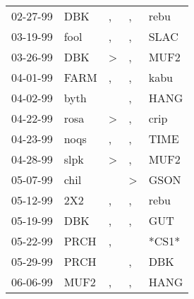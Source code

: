 \begin{supertabular}{p{0.07\textwidth}p{0.06\textwidth}p{0.02\textwidth}p{0.02\textwidth}p{0.06\textwidth}}
          02-27-99\textsuperscript{} &            DBK\textsuperscript{} &                , &                , &           rebu\textsuperscript{} \\
          03-19-99\textsuperscript{} &           fool\textsuperscript{} &                , &                , &           SLAC\textsuperscript{} \\
          03-26-99\textsuperscript{} &            DBK\textsuperscript{} &     \textgreater &                , &           MUF2\textsuperscript{} \\
          04-01-99\textsuperscript{} &           FARM\textsuperscript{} &                , &                , &           kabu\textsuperscript{} \\
          04-02-99\textsuperscript{} &           byth\textsuperscript{} &                  &                , &           HANG\textsuperscript{} \\
          04-22-99\textsuperscript{} &           rosa\textsuperscript{} &     \textgreater &                , &           crip\textsuperscript{} \\
          04-23-99\textsuperscript{} &           noqs\textsuperscript{} &                , &                , &           TIME\textsuperscript{} \\
          04-28-99\textsuperscript{} &           slpk\textsuperscript{} &     \textgreater &                , &           MUF2\textsuperscript{} \\
          05-07-99\textsuperscript{} &           chil\textsuperscript{} &                  &     \textgreater &           GSON\textsuperscript{} \\
          05-12-99\textsuperscript{} &            2X2\textsuperscript{} &                , &                , &           rebu\textsuperscript{} \\
          05-19-99\textsuperscript{} &            DBK\textsuperscript{} &                , &                , &            GUT\textsuperscript{} \\
          05-22-99\textsuperscript{} &           PRCH\textsuperscript{} &                , &                  &                            *CS1* \\
          05-29-99\textsuperscript{} &           PRCH\textsuperscript{} &                  &                , &            DBK\textsuperscript{} \\
          06-06-99\textsuperscript{} &           MUF2\textsuperscript{} &                , &                , &           HANG\textsuperscript{} \\

\end{supertabular}
